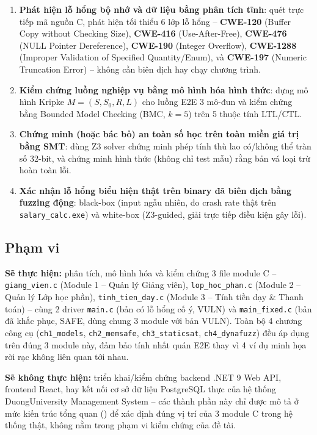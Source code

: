 \begin{enumerate}
  \item \textbf{Phát hiện lỗ hổng bộ nhớ và dữ liệu bằng phân tích tĩnh}: quét trực tiếp mã nguồn C, phát hiện tối thiểu 6 lớp lỗ hổng -- \textbf{CWE-120} (Buffer Copy without Checking Size), \textbf{CWE-416} (Use-After-Free), \textbf{CWE-476} (NULL Pointer Dereference), \textbf{CWE-190} (Integer Overflow), \textbf{CWE-1288} (Improper Validation of Specified Quantity/Enum), và \textbf{CWE-197} (Numeric Truncation Error) -- không cần biên dịch hay chạy chương trình.
  \item \textbf{Kiểm chứng luồng nghiệp vụ bằng mô hình hóa hình thức}: dựng mô hình Kripke $M=(S,S_0,R,L)$ cho luồng E2E 3 mô-đun và kiểm chứng bằng Bounded Model Checking (BMC, $k=5$) trên 5 thuộc tính LTL/CTL.
  \item \textbf{Chứng minh (hoặc bác bỏ) an toàn số học trên toàn miền giá trị bằng SMT}: dùng Z3 solver chứng minh phép tính thù lao có/không thể tràn số 32-bit, và chứng minh hình thức (không chỉ test mẫu) rằng bản vá loại trừ hoàn toàn lỗi.
  \item \textbf{Xác nhận lỗ hổng biểu hiện thật trên binary đã biên dịch bằng fuzzing động}: black-box (input ngẫu nhiên, đo crash rate thật trên \texttt{salary\_calc.exe}) và white-box (Z3-guided, giải trực tiếp điều kiện gây lỗi).
\end{enumerate}

\subsection{Phạm vi}

\textbf{Sẽ thực hiện:} phân tích, mô hình hóa và kiểm chứng 3 file module C -- \texttt{giang\_vien.c} (Module 1 -- Quản lý Giảng viên), \texttt{lop\_hoc\_phan.c} (Module 2 -- Quản lý Lớp học phần), \texttt{tinh\_tien\_day.c} (Module 3 -- Tính tiền dạy \& Thanh toán) -- cùng 2 driver \texttt{main.c} (bản có lỗ hổng cố ý, VULN) và \texttt{main\_fixed.c} (bản đã khắc phục, SAFE, dùng chung 3 module với bản VULN). Toàn bộ 4 chương công cụ (\texttt{ch1\_models}, \texttt{ch2\_memsafe}, \texttt{ch3\_staticsat}, \texttt{ch4\_dynafuzz}) đều áp dụng trên đúng 3 module này, đảm bảo tính nhất quán E2E thay vì 4 ví dụ minh họa rời rạc không liên quan tới nhau.

\textbf{Sẽ không thực hiện:} triển khai/kiểm chứng backend .NET 9 Web API, frontend React, hay kết nối cơ sở dữ liệu PostgreSQL thực của hệ thống DuongUniversity Management System -- các thành phần này chỉ được mô tả ở mức kiến trúc tổng quan () để xác định đúng vị trí của 3 module C trong hệ thống thật, không nằm trong phạm vi kiểm chứng của đề tài.
